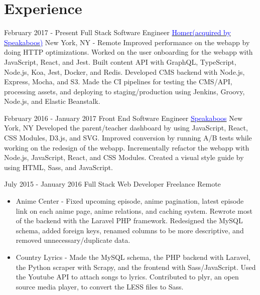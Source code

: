\documentclass[11pt,a4paper,sans]{moderncv}        %
\begin{document}
\makecvtitle

\section{Experience}

\cventry
  {February 2017 - Present}
  {Full Stack Software Engineer}
  {\textmd{\href{https://learnwithhomer.com}{\textcolor{blue}{Homer(acquired by Speakaboos)}}}}
  {\textmd{New York, NY - Remote}}{}
  {
    Improved performance on the webapp by doing HTTP optimizations.
    Worked on the user onboarding for the webapp with JavaScript, React, and Jest.
    Built content API with GraphQL, TypeScript, Node.js, Koa, Jest, Docker, and Redis.
    Developed CMS backend with Node.js, Express, Mocha, and S3.
    Made the CI pipelines for testing the CMS/API, processing assets, and deploying to staging/production using Jenkins, Groovy, Node.js, and Elastic Beanstalk.
  }

\cventry
  {February 2016 - January 2017}
  {Front End Software Engineer}
  {\textmd{\href{https://www.speakaboos.com}{\textcolor{blue}{Speakaboos}}}}
  {\textmd{New York, NY}}{}
  {
    Developed the parent/teacher dashboard by using JavaScript, React, CSS Modules, D3.js, and SVG.
    Improved conversion by running A/B tests while working on the redesign of the webapp.
    Incrementally refactor the webapp with Node.js, JavaScript, React, and CSS Modules.
    Created a visual style guide by using HTML, Sass, and JavaScript.
  }

\cventry
  {July 2015 - January 2016}
  {Full Stack Web Developer}
  {\textmd{Freelance}}
  {\textmd{Remote}}{}
  {
    \begin{itemize}
    \item Anime Center -
      Fixed upcoming episode, anime pagination, latest episode link on each anime page, anime relations, and caching system.
      Rewrote most of the backend with the Laravel PHP framework.
      Redesigned the MySQL schema, added foreign keys, renamed columns to be more descriptive, and removed unnecessary/duplicate data.
    \item Country Lyrics -
      Made the MySQL schema, the PHP backend with Laravel, the Python scraper with Scrapy, and the frontend with Sass/JavaScript.
      Used the Youtube API to attach songs to lyrics.
      Contributed to plyr, an open source media player, to convert the LESS files to Sass.
    \end{itemize}
  }
\end{document}
